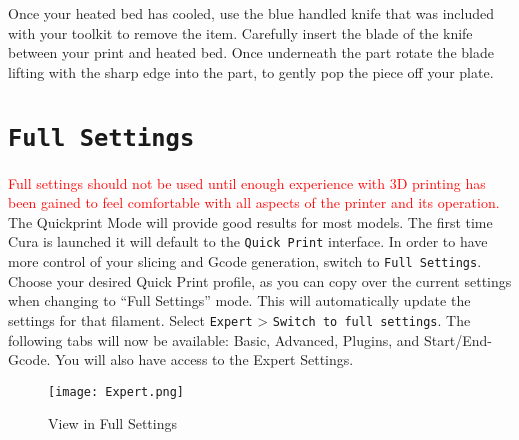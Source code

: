 Once your heated bed has cooled, use the blue handled knife that was included with your toolkit to remove the item. Carefully insert the blade of the knife between your print and heated bed. Once underneath the part rotate the blade lifting with the sharp edge into the part, to gently pop the piece off your plate.

\section{\texttt{Full Settings}}
\textcolor{red}{Full settings should not be used until enough experience with 3D printing has been gained to feel comfortable with all aspects of the printer and its operation.} The Quickprint Mode will provide good results for most models.
The first time Cura is launched it will default to the \texttt{Quick Print} interface. In order to have more control of your slicing and Gcode generation, switch to \texttt{Full Settings}. Choose your desired Quick Print profile, as you can copy over the current settings when changing to ``Full Settings'' mode. This will automatically update the settings for that filament. Select \texttt{Expert} > \texttt{Switch to full settings}. The following tabs will now be available: Basic, Advanced, Plugins, and Start/End-Gcode. You will also have access to the Expert Settings. 
\begin{figure}[H]
\centering
\texttt{[image: Expert.png]}
\caption{View in Full Settings}
\label{fig:Full Settings View}
\end{figure}


